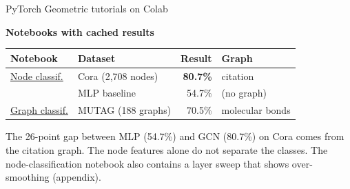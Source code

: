 \documentclass[aspectratio=169,11pt]{beamer}
\begin{document}
\begin{frame}{PyTorch Geometric tutorials on Colab}
  \vspace{0.2em}
  \begin{center}\small
    \textbf{Notebooks with cached results}
  \end{center}
  \vspace{0.3em}
  \centering\small
  \begin{tabular}{@{}llrl@{}}
    \toprule
    \textbf{Notebook} & \textbf{Dataset} & \textbf{Result} & \textbf{Graph} \\
    \midrule
    \href{https://colab.research.google.com/github/Chung-I/MiRA_training_course_2026/blob/main/notebooks/pyg_node_classification.ipynb}{Node classif.}
      & Cora (2,708 nodes)
      & \textcolor{good}{\textbf{80.7\%}}
      & citation \\
      & {\color{dim}MLP baseline}
      & {\color{dim}54.7\%}
      & {\color{dim}(no graph)} \\[0.3em]
    \href{https://colab.research.google.com/github/Chung-I/MiRA_training_course_2026/blob/main/notebooks/pyg_graph_classification.ipynb}{Graph classif.}
      & MUTAG (188 graphs)
      & 70.5\%
      & molecular bonds \\
    \bottomrule
  \end{tabular}
  \vspace{0.4em}

  \begin{center}\small
    The 26-point gap between MLP (54.7\%) and GCN (80.7\%) on Cora comes
    from the citation graph. The node features alone do not separate the
    classes. The node-classification notebook also contains a layer sweep
    that shows over-smoothing (appendix).
  \end{center}
\end{frame}
\end{document}
